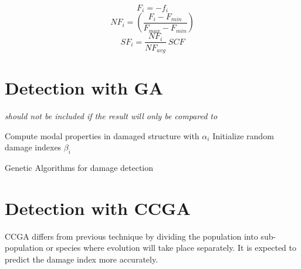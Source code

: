 \begin{equation}\label{eq:fitness}
F_i = -f_i 
\end{equation}
\begin{equation}\label{eq:norm fitness}
NF_i = \left( \frac{F_i - F_{min}}{F_{max}-F_{min}}\right)
\end{equation}
\begin{equation}\label{eq:scaled fitness}
SF_i = \frac{NF_i}{NF_{avg}}\:SCF
\end{equation}


\section{Detection with GA}
\noindent
\emph{should not be included if the result will only be compared to \cite{rao2004}}


\bigskip
\begin{algorithm}[H]
 \SetAlgoLined
 Compute modal properties in damaged structure with $\alpha_i$  \;
 Initialize random damage indexes $\beta_i$\;
 \caption{Genetic Algorithms for damage detection}
\end{algorithm}

\section{Detection with CCGA}
CCGA differs from previous technique by dividing the population into sub-population or species where evolution will take place separately. It is expected to predict the damage index more accurately. 

